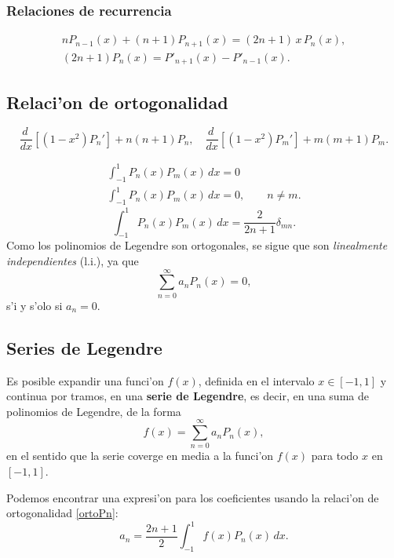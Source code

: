 \subsubsection{Relaciones de recurrencia}
\begin{gather}
nP_{n-1}(x)+(n+1)P_{n+1}(x)=(2n+1)\,x\,P_n(x), \\
(2n+1)P_n(x)=P'_{n+1}(x)-P'_{n-1}(x).
\end{gather}

\subsection{Relaci'on de ortogonalidad}
\begin{equation}
\frac{d\ }{dx}\left[(1 - x^2) P_n' \right]+ n (n + 1) P_n, \quad
\frac{d\ }{dx}\left[(1 - x^2) P_m' \right]+ m (m + 1) P_m .
\end{equation}

\begin{gather}
[n (n + 1) - m (m + 1)]\int_{-1}^1 P_n(x) P_m(x)\,d x = 0 
\\
\int_{-1}^1 P_n(x) P_m(x)\,d x = 0, \qquad n\neq m.
\end{gather}
\begin{equation}\label{ortoPn}
\boxed{\int_{-1}^{1}P_n(x)P_m(x)\,dx=\frac{2}{2n+1}\delta_{mn}.}
\end{equation}
Como los polinomios de Legendre son ortogonales, se sigue que son \textit{linealmente independientes} (l.i.), ya que
\begin{equation}
\sum_{n=0}^\infty a_nP_n(x)=0,
\end{equation}
s'i y s'olo si $a_n=0$.
\subsection{Series de Legendre}
Es posible expandir una funci'on $f(x)$, definida en el intervalo $x\in[-1,1]$ y continua por tramos, en una \textbf{serie de Legendre}, es decir, en una suma de polinomios de Legendre, de la forma
\begin{equation}
f(x)=\sum_{n=0}^\infty a_nP_n(x),
\end{equation}
en el sentido que la serie coverge en media a la funci'on $f(x)$ para todo $x$ en $[-1,1]$.

Podemos encontrar una expresi'on para los coeficientes usando la relaci'on de ortogonalidad \eqref{ortoPn}:
\begin{equation}
a_n=\frac{2n+1}{2}\int_{-1}^1 f(x)P_n(x)\,dx.
\end{equation}
